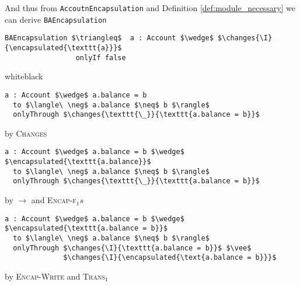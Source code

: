 And thus from \texttt{AccoutnEncapsulation} and Definition \ref{def:module_necessary} we can derive \texttt{BAEncapsulation}
\begin{lstlisting}[language = Chainmail, mathescape=true, frame=lines]
BAEncapsulation $\triangleq$  a : Account $\wedge$ $\changes{\I}{\encapsulated{\texttt{a}}}$
                 onlyIf false
\end{lstlisting}
\begin{minipage}{\linewidth}
\begin{proofBox}{white}{black}
\footnotesize
\begin{minipage}{0.75\textwidth}
\begin{lstlisting}[language = Chainmail, mathescape=true, frame = single]
a : Account $\wedge$ a.balance = b 
  to $\langle\ \neg$ a.balance $\neq$ b $\rangle$ 
  onlyThrough $\changes{\texttt{\_}}{\texttt{a.balance = b}}$
\end{lstlisting}
\end{minipage}
\begin{minipage}{0.24\textwidth}
\scriptsize
\hfill by \textsc{Changes}
\end{minipage}
\begin{minipage}{0.75\textwidth}
\begin{lstlisting}[language = Chainmail, mathescape=true]
a : Account $\wedge$ a.balance = b $\wedge$ $\encapsulated{\texttt{a.balance}}$ 
  to $\langle\ \neg$ a.balance $\neq$ b $\rangle$ 
  onlyThrough $\changes{\texttt{\_}}{\texttt{a.balance = b}}$
\end{lstlisting}
\end{minipage}
\begin{minipage}{0.24\textwidth}
\scriptsize
\hfill by $\longrightarrow$ and \textsc{Encap-f}$_1s$
\end{minipage}
\begin{minipage}{0.75\textwidth}
\begin{lstlisting}[language = Chainmail, mathescape=true]
a : Account $\wedge$ a.balance = b $\wedge$ $\encapsulated{\texttt{a.balance = b}}$ 
  to $\langle\ \neg$ a.balance $\neq$ b $\rangle$ 
  onlyThrough $\changes{\I}{\texttt{a.balance = b}}$ $\vee$ 
              $\changes{\I}{\encapsulated{\text{a.balance = b}}}$
\end{lstlisting}
\end{minipage}
\begin{minipage}{0.24\textwidth}
\scriptsize
\hfill by \textsc{Encap-Write} and \textsc{Trans}$_1$

\end{minipage}
\end{proofBox}
\end{minipage}
